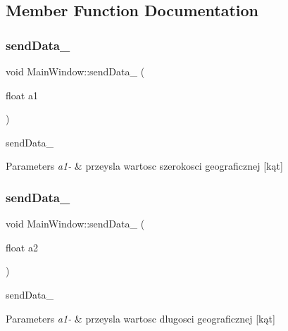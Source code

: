 \subsection{Member Function Documentation}
\mbox{\label{class_main_window_aaa0e90647372b46a538c32dc8013fa72}} 
\subsubsection{\texorpdfstring{send\+Data\+\_}{sendData\_1}}
{\footnotesize\ttfamily void Main\+Window\+::send\+Data\+\_ (\begin{DoxyParamCaption}\item[{float}]{a1 }\end{DoxyParamCaption})\hspace{0.3cm}{\ttfamily [signal]}}



send\+Data\+\_ 


\begin{DoxyParams}{Parameters}
{\em a1-\/} & przeysla wartosc szerokosci geograficznej \mbox{[}kąt\mbox{]} \\
\hline
\end{DoxyParams}
\mbox{\label{class_main_window_a5d2d118cbfdd9009c99d20bcb3985ecb}} 
\subsubsection{\texorpdfstring{send\+Data\+\_}{sendData\_2}}
{\footnotesize\ttfamily void Main\+Window\+::send\+Data\+\_ (\begin{DoxyParamCaption}\item[{float}]{a2 }\end{DoxyParamCaption})\hspace{0.3cm}{\ttfamily [signal]}}



send\+Data\+\_ 


\begin{DoxyParams}{Parameters}
{\em a1-\/} & przeysla wartosc dlugosci geograficznej \mbox{[}kąt\mbox{]} \\
\hline
\end{DoxyParams}
\mbox{\label{class_main_window_afa13ec675395ccd35c4aa4e40664e22b}} 
